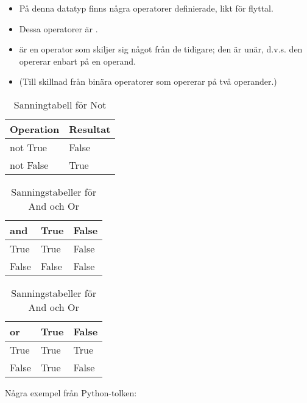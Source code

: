 \documentclass{beamer}
\begin{document}
\begin{frame}{\insertsubsectionhead}
  \begin{itemize}
    \item På denna datatyp  finns några operatorer definierade, likt 
      \code{+ - * /} för flyttal.
    \item Dessa operatorer är .
    \item {} är en operator som skiljer sig något från de tidigare; den 
      är unär, d.v.s. den opererar enbart på en operand.
    \item (Till skillnad från binära operatorer som opererar på två operander.)
  \end{itemize}
\end{frame}

\begin{frame}{\insertsubsectionhead}
  \begin{table}[h]
    \begin{tabular}{l|l}
      Operation & Resultat \\
      \hline
      not True & False \\
      not False & True
    \end{tabular}
    \label{tbl:not}
    \caption{Sanningtabell för Not}
  \end{table}

  \begin{table}[h]
    \begin{tabular}{l|ll}
      and & True & False \\
      \hline
      True & True & False \\
      False & False & False
    \end{tabular}
    \begin{tabular}{l|ll}
      or & True & False \\
      \hline
      True & True & True \\
      False & True & False
    \end{tabular}
    \label{tbl:andor}
    \caption{Sanningstabeller för And och Or}
  \end{table}
\end{frame}

\begin{frame}{\insertsubsectionhead}
  Några exempel från Python-tolken:
\end{frame}
\end{document}
